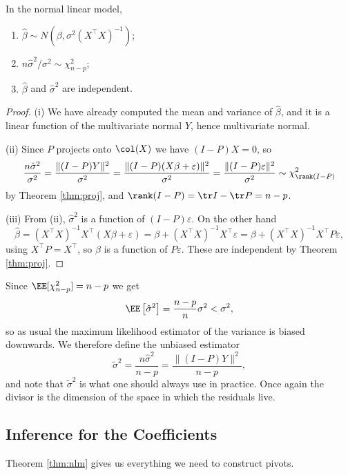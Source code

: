 \begin{theorem}\label{thm:nlm}
  In the normal linear model,
  \begin{enumerate}[label=(\roman*)]
    \item $\hat\beta \sim N\left(\beta, \sigma^2(X^\top X)^{-1}\right)$;
    \item $n\hat\sigma^2/\sigma^2 \sim \chi^2_{n-p}$;
    \item $\hat\beta$ and $\hat\sigma^2$ are independent.
  \end{enumerate}
\end{theorem}
\begin{proof}
  (i) We have already computed the mean and variance of $\hat\beta$, and it is a linear function of the multivariate normal $Y$, hence multivariate normal.

  (ii) Since $P$ projects onto $\col(X)$ we have $(I-P)X = 0$, so
  $$
  \frac{n\hat\sigma^2}{\sigma^2} = \frac{\|(I-P)Y\|^2}{\sigma^2} = \frac{\|(I-P)(X\beta+\varepsilon)\|^2}{\sigma^2} = \frac{\|(I-P)\varepsilon\|^2}{\sigma^2}\sim\chi^2_{\rank(I-P)}
  $$
  by Theorem \ref{thm:proj}, and $\rank(I-P) = \tr I - \tr P = n - p$.

  (iii) From (ii), $\hat\sigma^2$ is a function of $(I-P)\varepsilon$. On the other hand
  $$
  \hat\beta = (X^\top X)^{-1}X^\top(X\beta+\varepsilon) = \beta + (X^\top X)^{-1}X^\top\varepsilon = \beta + (X^\top X)^{-1}X^\top P\varepsilon,
  $$
  using $X^\top P = X^\top$, so $\hat\beta$ is a function of $P\varepsilon$. These are independent by Theorem \ref{thm:proj}.
\end{proof}

Since $\EE[\chi^2_{n-p}] = n-p$ we get
$$
\EE\left[\hat\sigma^2\right] = \frac{n-p}{n}\sigma^2 < \sigma^2,
$$
so as usual the maximum likelihood estimator of the variance is biased downwards. We therefore define the unbiased estimator
$$
\tilde\sigma^2 = \frac{n\hat\sigma^2}{n-p} = \frac{\|(I-P)Y\|^2}{n-p},
$$
and note that $\tilde\sigma^2$ is what one should always use in practice. Once again the divisor is the dimension of the space in which the residuals live.

\subsection{Inference for the Coefficients}

Theorem \ref{thm:nlm} gives us everything we need to construct pivots.

